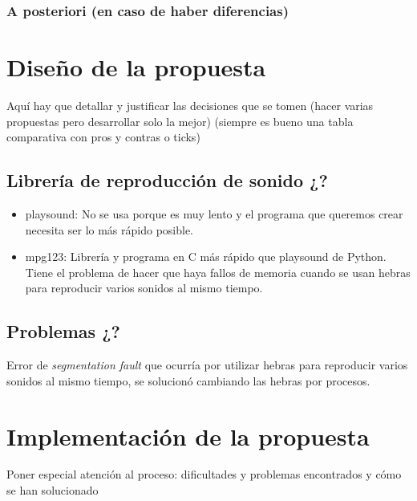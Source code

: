 \documentclass{article}
\begin{document}
 \subsubsection{A posteriori (en caso de haber diferencias)} 
 
 

\section{Diseño de la propuesta}

 Aquí hay que detallar y justificar las decisiones que se tomen (hacer varias propuestas pero desarrollar solo la mejor) (siempre es bueno una tabla comparativa con pros y contras o ticks)
 
 \subsection{Librería de reproducción de sonido ¿?}
 \begin{itemize}
     \item playsound\cite{playsound}: No se usa porque es muy lento y el programa que queremos crear necesita ser lo más rápido posible.
     \item mpg123\cite{mpg123}: Librería y programa en C más rápido que playsound de Python. Tiene el problema de hacer que haya fallos de memoria cuando se usan hebras para reproducir varios sonidos al mismo tiempo.
 \end{itemize} 
 
 \subsection{Problemas ¿?}
 Error de \textit{segmentation fault} que ocurría por utilizar hebras para reproducir varios sonidos al mismo tiempo, se solucionó cambiando las hebras por procesos.
 
\section{Implementación de la propuesta}

 Poner especial atención al proceso: dificultades y problemas encontrados y cómo se han solucionado
 
\end{document}
